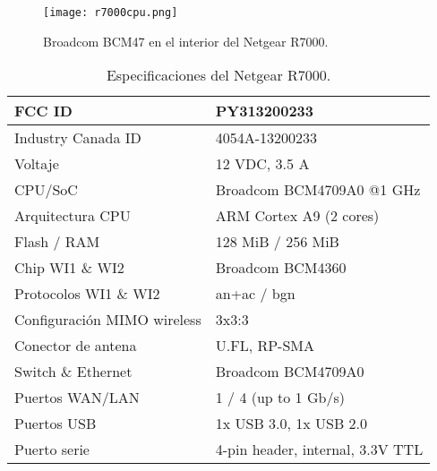 \begin{figure}[H]
    \centering
    \texttt{[image: r7000cpu.png]}
    \caption{Broadcom BCM47 en el interior del Netgear R7000.\cite{netgearFCCid}}
    \label{fig:r7000cpu}
\end{figure}

\begin{table}[H]
    \centering
    \begin{tabular}{ |l|m{20em}| }
    \hline
    FCC ID                      & PY313200233                      \\\hline
    Industry Canada ID          & 4054A-13200233                   \\\hline
    Voltaje                     & 12 VDC, 3.5 A                    \\\hline
    CPU/SoC                     & Broadcom BCM4709A0 @1 GHz        \\\hline
    Arquitectura CPU            & ARM Cortex A9 (2 cores)          \\\hline
    Flash / RAM                 & 128 MiB / 256 MiB                \\\hline
    Chip WI1 \& WI2             & Broadcom BCM4360                 \\\hline
    Protocolos WI1 \& WI2       & an+ac / bgn                      \\\hline
    Configuración MIMO wireless & 3x3:3                            \\\hline
    Conector de antena          & U.FL, RP-SMA                     \\\hline
    Switch \& Ethernet          & Broadcom BCM4709A0               \\\hline
    Puertos WAN/LAN             & 1 / 4 (up to 1 Gb/s)             \\\hline
    Puertos USB                 & 1x USB 3.0, 1x USB 2.0           \\\hline
    Puerto serie                & 4-pin header, internal, 3.3V TTL \\\hline
    \end{tabular}
    \caption{Especificaciones del Netgear R7000.\cite{r7000datasheet}}
    \label{table:r7000}
\end{table}

